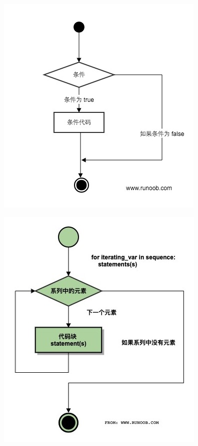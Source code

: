 \documentclass[11pt]{beamer}
\begin{document}
\begin{frame}[fragile]
\begin{minipage}[t]{0.5\linewidth}
			\begin{figure}
		\centering
		\includegraphics[height=0.35\textheight]{figures/ifelse}
		\label{fig:ifelse}
	\end{figure}
	\end{minipage}%
	\begin{minipage}[t]{0.05\linewidth}
		\quad
	\end{minipage}%
	\begin{minipage}[t]{0.4\linewidth}
\begin{figure}
	\centering
	\includegraphics[height=0.35\textheight]{figures/forloop}
	\label{fig:forloop}
\end{figure}	


\end{minipage}
\end{frame}
\end{document}
